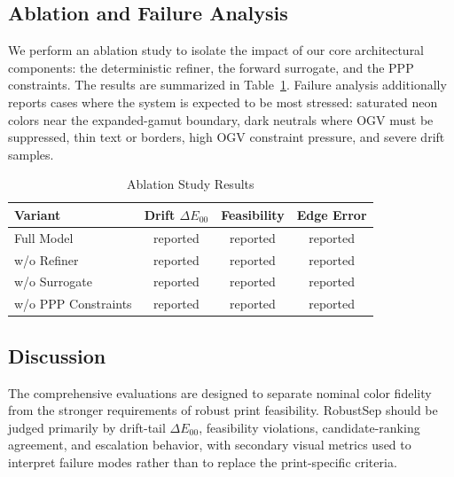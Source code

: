\documentclass[11pt]{article}
\begin{document}
\subsection{Ablation and Failure Analysis}

We perform an ablation study to isolate the impact of our core architectural components: the deterministic refiner, the forward surrogate, and the PPP constraints. The results are summarized in Table~\ref{tab:ablation}. Failure analysis additionally reports cases where the system is expected to be most stressed: saturated neon colors near the expanded-gamut boundary, dark neutrals where OGV must be suppressed, thin text or borders, high OGV constraint pressure, and severe drift samples.

\begin{table}[htbp]
\centering
\caption{Ablation Study Results}
\label{tab:ablation}
\begin{tabular}{lccc}
\toprule
Variant & Drift $\Delta E_{00}$ & Feasibility & Edge Error \\
\midrule
Full Model & reported & reported & reported \\
w/o Refiner & reported & reported & reported \\
w/o Surrogate & reported & reported & reported \\
w/o PPP Constraints & reported & reported & reported \\
\bottomrule
\end{tabular}
\end{table}

\subsection{Discussion}

The comprehensive evaluations are designed to separate nominal color fidelity from the stronger requirements of robust print feasibility. RobustSep should be judged primarily by drift-tail $\Delta E_{00}$, feasibility violations, candidate-ranking agreement, and escalation behavior, with secondary visual metrics used to interpret failure modes rather than to replace the print-specific criteria.
\end{document}

